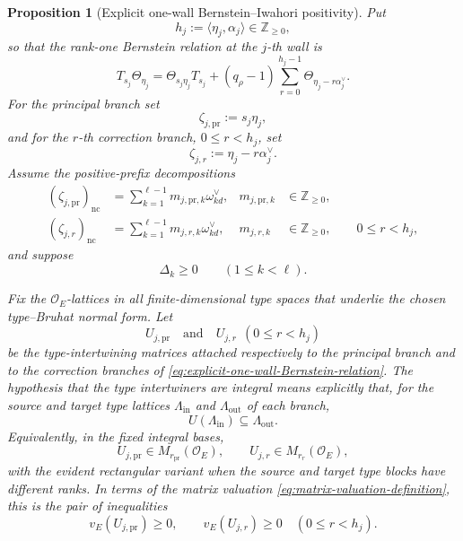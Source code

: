 \documentclass[12pt]{article}
\newtheorem{proposition}[theorem]{Proposition}
\theoremstyle{definition}
\theoremstyle{remark}
\newcommand{\Ocoeff}{\mathcal O_E}
\begin{document}
\begin{proposition}[Explicit one-wall Bernstein--Iwahori positivity]
\label{prop:one-wall-Bernstein-Iwahori-positivity}
Put
\[
 h_j:=\langle\eta_j,\alpha_j\rangle\in\mathbb Z_{\geq0},
\]
so that the rank-one Bernstein relation at the \(j\)-th wall is
\begin{equation}\label{eq:explicit-one-wall-Bernstein-relation}
 T_{s_j}\Theta_{\eta_j}
 =
 \Theta_{s_j\eta_j}T_{s_j}
 +(q_\rho-1)
 \sum_{r=0}^{h_j-1}
 \Theta_{\eta_j-r\alpha_j^\vee}.
\end{equation}
For the principal branch set
\[
 \zeta_{j,\mathrm{pr}}:=s_j\eta_j,
\]
and for the \(r\)-th correction branch, \(0\leq r<h_j\), set
\[
 \zeta_{j,r}:=\eta_j-r\alpha_j^\vee.
\]
Assume the positive-prefix decompositions
\begin{align}
 (\zeta_{j,\mathrm{pr}})_{\mathrm{nc}}
 &=
 \sum_{k=1}^{\ell-1}
 m_{j,\mathrm{pr},k}\omega_{kd}^\vee,
 &
 m_{j,\mathrm{pr},k}&\in\mathbb Z_{\geq0},
 \label{eq:one-wall-principal-prefix-explicit}\\
 (\zeta_{j,r})_{\mathrm{nc}}
 &=
 \sum_{k=1}^{\ell-1}
 m_{j,r,k}\omega_{kd}^\vee,
 &
 m_{j,r,k}&\in\mathbb Z_{\geq0},
 \qquad 0\leq r<h_j,
 \label{eq:one-wall-correction-prefix-explicit}
\end{align}
and suppose
\begin{equation}\label{eq:one-wall-defects-nonnegative}
 \Delta_k\geq0
 \qquad(1\leq k<\ell).
\end{equation}

Fix the \(\Ocoeff\)-lattices in all finite-dimensional type spaces that
underlie the chosen type--Bruhat normal form.  Let
\[
 U_{j,\mathrm{pr}}
 \quad\text{and}\quad
 U_{j,r}\ \ (0\leq r<h_j)
\]
be the type-intertwining matrices attached respectively to the principal
branch and to the correction branches of
\eqref{eq:explicit-one-wall-Bernstein-relation}.  The hypothesis that the
type intertwiners are \emph{integral} means explicitly that, for the source
and target type lattices \(\Lambda_{\mathrm{in}}\) and
\(\Lambda_{\mathrm{out}}\) of each branch,
\begin{equation}\label{eq:one-wall-type-intertwiner-lattice-integrality}
 U(\Lambda_{\mathrm{in}})
 \subseteq
 \Lambda_{\mathrm{out}}.
\end{equation}
Equivalently, in the fixed integral bases,
\begin{equation}\label{eq:one-wall-type-intertwiner-matrix-integrality}
 U_{j,\mathrm{pr}}\in M_{r_{\mathrm{pr}}}(\Ocoeff),
 \qquad
 U_{j,r}\in M_{r_r}(\Ocoeff),
\end{equation}
with the evident rectangular variant when the source and target type blocks
have different ranks.  In terms of the matrix valuation
\eqref{eq:matrix-valuation-definition}, this is the pair of inequalities
\begin{equation}\label{eq:one-wall-type-intertwiner-valuation-integrality}
 v_E(U_{j,\mathrm{pr}})\geq0,
 \qquad
 v_E(U_{j,r})\geq0
 \quad(0\leq r<h_j).
\end{equation}


\end{proposition}
\end{document}
